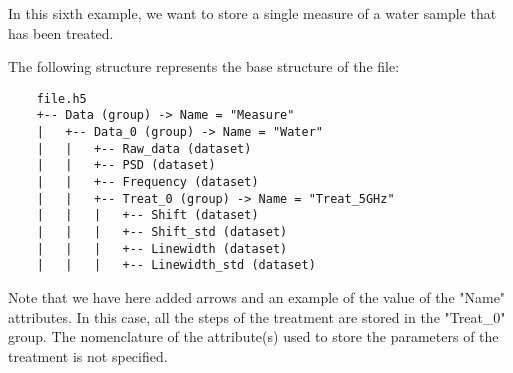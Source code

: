 In this sixth example, we want to store a single measure of a water sample that has been treated.

The following structure represents the base structure of the file:
\begin{verbatim}
    file.h5
    +-- Data (group) -> Name = "Measure"
    |   +-- Data_0 (group) -> Name = "Water"
    |   |   +-- Raw_data (dataset)
    |   |   +-- PSD (dataset)
    |   |   +-- Frequency (dataset)
    |   |   +-- Treat_0 (group) -> Name = "Treat_5GHz"
    |   |   |   +-- Shift (dataset)
    |   |   |   +-- Shift_std (dataset)
    |   |   |   +-- Linewidth (dataset)
    |   |   |   +-- Linewidth_std (dataset)
\end{verbatim}
Note that we have here added arrows and an example of the value of the "Name" attributes.
In this case, all the steps of the treatment are stored in the "Treat\_0" group. The nomenclature of the attribute(s) used to store the parameters of the treatment is not specified.